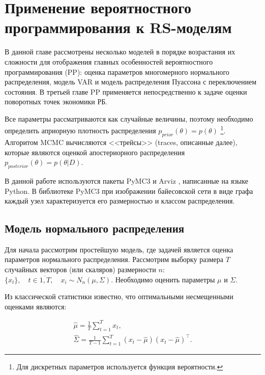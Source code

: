 \documentclass[a4paper,14pt]{extreport}
\begin{document}
\section{Применение вероятностного программирования к RS-моделям}

\label{section:pp_for_rs}

В данной главе рассмотрены несколько моделей в порядке возрастания их сложности для отображения главных особенностей вероятностного программирования (PP): оценка параметров многомерного нормального распределения, модель VAR и модель распределения Пуассона с переключением состояния. В третьей главе PP применяется непосредственно к задаче оценки поворотных точек экономики РБ.

Все параметры рассматриваются как случайные величины, поэтому необходимо определить априорную плотность распределения $p_{prior}(\theta) = p(\theta)$ \footnote{Для дискретных параметров используется функция вероятности. }. Алгоритом MCMC вычисляются <<трейсы>> (traces, описанные далее), которые являются оценкой апостериорного распределения $p_{posterior}(\theta) = p(\theta|D)$.

В данной работе используются пакеты PyMC3 \cite{pymc3_2016} и Arviz \cite{arviz_2019}, написанные на языке Python. В библиотеке PyMC3 при изображении байесовской сети в виде графа каждый узел характеризуется его размерностью и классом распределения.


\subsection{Модель нормального распределения}

\label{subsection:mvn}

Для начала рассмотрим простейшую модель, где задачей является оценка параметров нормального распределения. Рассмотрим выборку размера $T$ случайных векторов (или скаляров) размерности $n$: $\{x_t\}, \quad t\in\overline{1,T}, \quad x_i \sim N_n(\mu, \Sigma)$. Необходимо оценить параметры $\mu$ и $\Sigma$. 

Из классической статистики известно, что оптимальными несмещенными оценками являются:

\begin{equation}
	\begin{multlined}
		\hat{\mu}=\frac{1}{T}\sum\limits_{t=1}^{T}{x_t}, \\
		\hat{\Sigma}=\frac{1}{T-1}\sum\limits_{t=1}^{T}{(x_t-\hat{\mu})(x_t-\hat{\mu})^\top} . 
	\end{multlined}
\end{equation}
\end{document}
